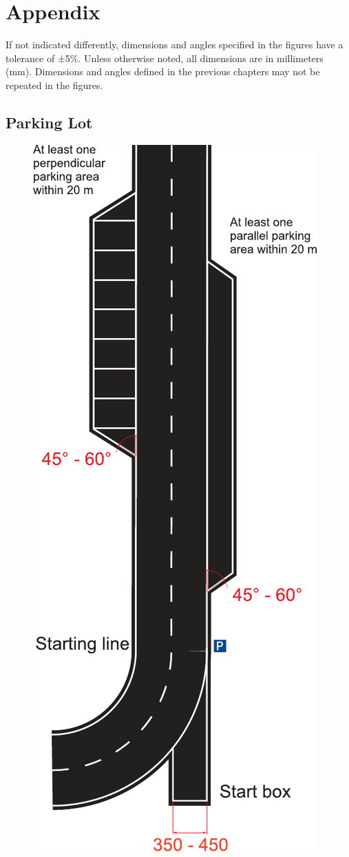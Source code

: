 \appendix
\chapter{Appendix}
If not indicated differently, dimensions and angles specified in the figures
have a tolerance of ±5\%. Unless otherwise noted, all dimensions are in
millimeters (mm). Dimensions and angles defined in the previous chapters may
not be repeated in the figures.

\section{Parking Lot}
\label{fig_parking_lot}
\begin{figure}[H]
	\begin{center}
		\centering\includegraphics[scale=0.8]{graphics/Abb_1_parking_lot.pdf}

\end{center}
\end{figure}
